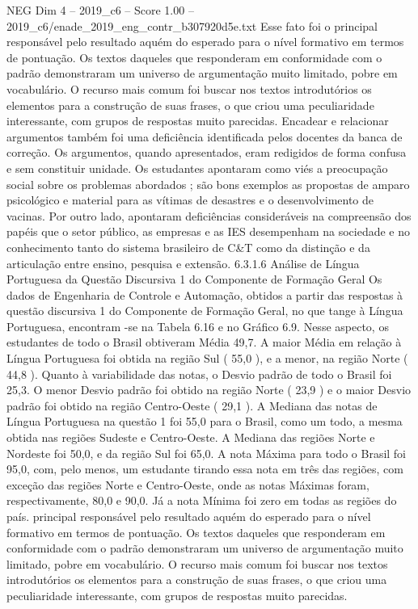 \begin{textsample}{NEG Dim 4 – 2019\_c6 – Score 1.00 – 2019\_c6/enade\_2019\_eng\_contr\_b307920d5e.txt}
Esse fato foi o principal responsável pelo resultado aquém do esperado para o nível formativo em termos de pontuação.
Os textos daqueles que responderam em conformidade com o padrão demonstraram um universo de argumentação muito limitado, pobre em vocabulário.
O recurso mais comum foi buscar nos textos introdutórios os elementos para a construção de suas frases, o que criou uma peculiaridade interessante, com grupos de respostas muito parecidas.
Encadear e relacionar argumentos também foi uma deficiência identificada pelos docentes da banca de correção.
Os argumentos, quando apresentados, eram redigidos de forma confusa e sem constituir unidade.
Os estudantes apontaram como viés a preocupação social sobre os problemas abordados ; são bons exemplos as propostas de amparo psicológico e material para as vítimas de desastres e o desenvolvimento de vacinas.
Por outro lado, apontaram deficiências consideráveis na compreensão dos papéis que o setor público, as empresas e as IES desempenham na sociedade e no conhecimento tanto do sistema brasileiro de C\&T como da distinção e da articulação entre ensino, pesquisa e extensão. 6.3.1.6 Análise de Língua Portuguesa da Questão Discursiva 1 do Componente de Formação Geral Os dados de Engenharia de Controle e Automação, obtidos a partir das respostas à questão discursiva 1 do Componente de Formação Geral, no que tange à Língua Portuguesa, encontram -se na Tabela 6.16 e no Gráfico 6.9.
Nesse aspecto, os estudantes de todo o Brasil obtiveram Média 49,7.
A maior Média em relação à Língua Portuguesa foi obtida na região Sul ( 55,0 ), e a menor, na região Norte ( 44,8 ).
Quanto à variabilidade das notas, o Desvio padrão de todo o Brasil foi 25,3.
O menor Desvio padrão foi obtido na região Norte ( 23,9 ) e o maior Desvio padrão foi obtido na região Centro-Oeste ( 29,1 ).
A Mediana das notas de Língua Portuguesa na questão 1 foi 55,0 para o Brasil, como um todo, a mesma obtida nas regiões Sudeste e Centro-Oeste.
A Mediana das regiões Norte e Nordeste foi 50,0, e da região Sul foi 65,0.
A nota Máxima para todo o Brasil foi 95,0, com, pelo menos, um estudante tirando essa nota em três das regiões, com exceção das regiões Norte e Centro-Oeste, onde as notas Máximas foram, respectivamente, 80,0 e 90,0.
Já a nota Mínima foi zero em todas as regiões do país. principal responsável pelo resultado aquém do esperado para o nível formativo em termos de pontuação.
Os textos daqueles que responderam em conformidade com o padrão demonstraram um universo de argumentação muito limitado, pobre em vocabulário.
O recurso mais comum foi buscar nos textos introdutórios os elementos para a construção de suas frases, o que criou uma peculiaridade interessante, com grupos de respostas muito parecidas.

\end{textsample}
